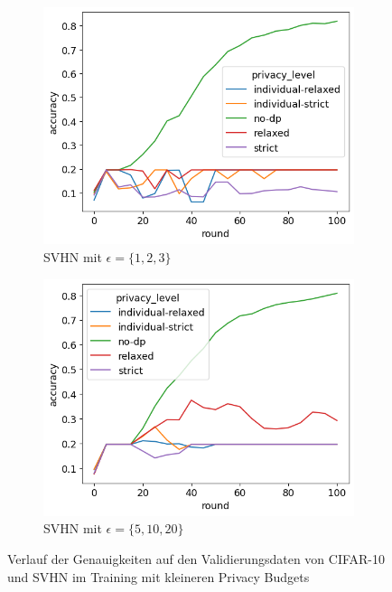 \begin{figure}[tb]
\begin{subfigure}{0.45\textwidth}
		\includegraphics[width=\linewidth]{Bilder/svhn-accuracy-eps-1-2-3.png}
		\caption{SVHN mit $\epsilon = \{1,2,3\}$}
	\end{subfigure}
	\begin{subfigure}{0.45\textwidth}
		\centering
		\includegraphics[width=\linewidth]{Bilder/svhn-accuracy-eps-5-10-20.png}
		\caption{SVHN mit $\epsilon = \{5,10,20\}$}
	\end{subfigure}
	\caption{Verlauf der Genauigkeiten auf den Validierungsdaten von CIFAR-10 und SVHN im Training mit kleineren Privacy Budgets}
	\label{fig:cifar-svhn-small-budgets}
\end{figure}